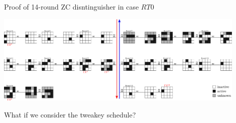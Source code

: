 \documentclass{beamer}
\begin{document}
\begin{frame}{Proof of 14-round ZC disntinguisher in case $RT0$}


\begin{center}
    \includegraphics[width = 12cm]{./Images/zc_14r_tk0_0.pdf}
\end{center}
\vspace{1.45cm}
\begin{center}
    What if we consider the tweakey schedule?
\end{center}
\end{frame}
\end{document}
